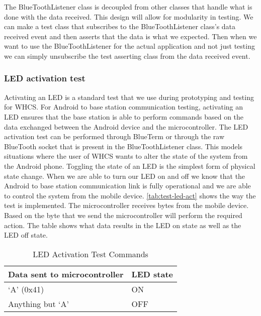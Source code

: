The BlueToothListener class is decoupled from other classes that handle what is
done with the data received. This design will allow for modularity in testing.
We can make a test class that subscribes to the BlueToothListener class{}'s
data received event and then asserts that the data is what we expected. Then
when we want to use the BlueToothListener for the actual application and not
just testing we can simply unsubscribe the test asserting class from the data
received event.

\subsubsection{LED activation test}
Activating an LED is a standard test that we use during prototyping and
testing for WHCS. For Android to base station communication testing, activating
an LED ensures that the base station is able to perform commands based on the
data exchanged between the Android device and the microcontroller. The LED
activation test can be performed through BlueTerm or through the raw BlueTooth
socket that is present in the BlueToothListener class. This models
situations where the user of WHCS wants to alter the state of the system from
the Android phone. Toggling the state of an LED is the simplest form of
physical state change. When we are able to turn our LED on and off we know that
the Android to base station communication link is fully operational and we
are able to control the system from the mobile device.  \autoref{tab:test-led-act}
shows the way the test is implemented. The microcontroller receives
bytes from the mobile device. Based on the byte that we send the
microcontroller will perform the required action. The table shows what data
results in the LED on state as well as the LED off state.

\begin{table}[H]
\centering
\begin{tabular}{|l|l|}
\hline
{\color{black} Data sent to microcontroller} &
{\color{black} LED state}\\\hline
{\color{black} {}`A{}' (0x41)} &
{\color{black} ON}\\\hline
{\color{black} Anything but {}`A{}'} &
{\color{black} OFF}\\\hline
\end{tabular}
\caption{LED Activation Test Commands}
\label{tab:test-led-act}
\end{table}
